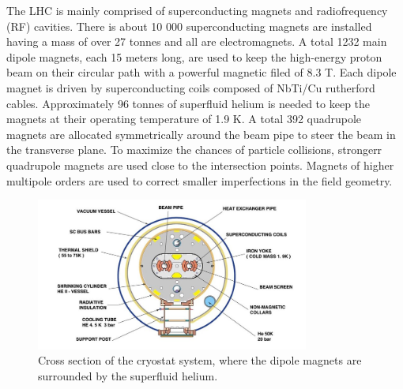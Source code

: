 The LHC is mainly comprised of superconducting magnets and radiofrequency (RF) cavities.
There is about 10 000 superconducting magnets are installed having a mass of over 27 tonnes and all are electromagnets.
A total 1232 main dipole magnets, each 15 meters long, are used to keep the high-energy proton beam on their circular path with a powerful magnetic filed of 8.3 T.
Each dipole magnet is driven by superconducting coils composed of NbTi/Cu rutherford cables.
Approximately 96 tonnes of superfluid helium is needed to keep the magnets at their operating temperature of 1.9 K.
A total 392 quadrupole magnets are allocated symmetrically around the beam pipe to steer the beam in the transverse plane.
To maximize the chances of particle collisions, strongerr quadrupole magnets are used close to the intersection points.
Magnets of higher multipole orders are used to correct smaller imperfections in the field geometry. 
\begin{figure}\centering
    \includegraphics[width=0.8\textwidth]{figure/lhc_xsect.jpg}
    \caption[Cross section of the cryostat system.]
    {Cross section of the cryostat system, where the dipole magnets are surrounded by the superfluid helium.}
    \label{fig:lhc_xsec}
\end{figure}

